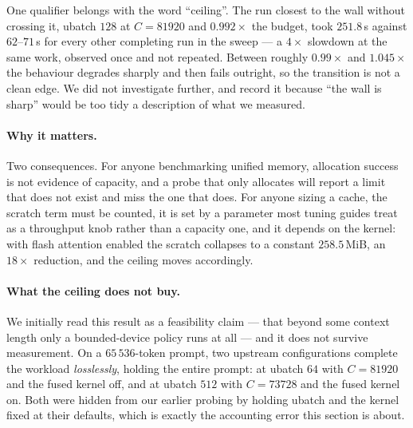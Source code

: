 \documentclass[manuscript,anonymous,review]{acmart}
\begin{document}
One qualifier belongs with the word ``ceiling''. The run closest to the
wall without crossing it, ubatch $128$ at $C = 81920$ and $0.992\times$
the budget, took $251.8$\,s against $62$--$71$\,s for every other
completing run in the sweep --- a $4\times$ slowdown at the same work,
observed once and not repeated. Between roughly $0.99\times$ and
$1.045\times$ the behaviour degrades sharply and then fails outright,
so the transition is not a clean edge. We did not investigate further,
and record it because ``the wall is sharp'' would be too tidy a
description of what we measured.

\paragraph{Why it matters.} Two consequences. For anyone benchmarking
unified memory, allocation success is not evidence of capacity, and a
probe that only allocates will report a limit that does not exist and
miss the one that does. For anyone sizing a cache, the scratch term
must be counted, it is set by a parameter most tuning guides treat as a
throughput knob rather than a capacity one, and it depends on the
kernel: with flash attention enabled the scratch collapses to a
constant $258.5$\,MiB, an $18\times$ reduction, and the ceiling moves
accordingly.

\paragraph{What the ceiling does not buy.} We initially read this
result as a feasibility claim --- that beyond some context length only
a bounded-device policy runs at all --- and it does not survive
measurement. On a $65\,536$-token prompt, two upstream configurations
complete the workload \emph{losslessly}, holding the entire prompt: at
ubatch $64$ with $C = 81920$ and the fused kernel off, and at ubatch
$512$ with $C = 73728$ and the fused kernel on. Both were hidden from
our earlier probing by holding ubatch and the kernel fixed at their
defaults, which is exactly the accounting error this section is about.
\end{document}
